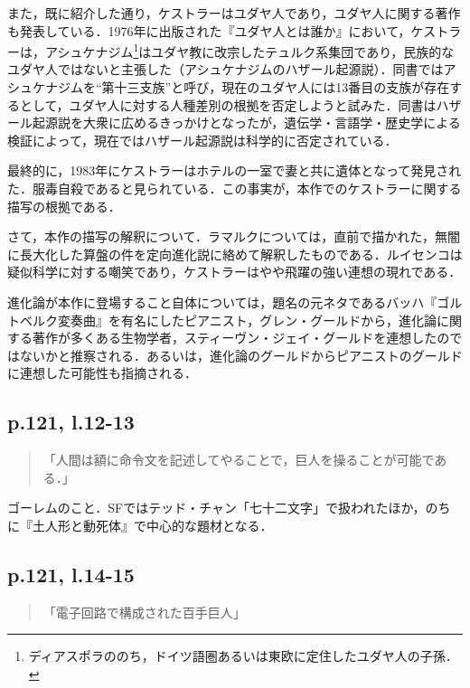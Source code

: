 \documentclass[10pt, a5paper, twoside]{ltjsarticle}
\begin{document}
            また，既に紹介した通り，ケストラーはユダヤ人であり，ユダヤ人に関する著作も発表している．1976年に出版された『ユダヤ人とは誰か』\cite{koestler2}において，ケストラーは，アシュケナジム\footnote{ディアスポラののち，ドイツ語圏あるいは東欧に定住したユダヤ人の子孫．}はユダヤ教に改宗したテュルク系集団であり，民族的なユダヤ人ではないと主張した（アシュケナジムのハザール起源説）．同書ではアシュケナジムを“第十三支族”と呼び，現在のユダヤ人には13番目の支族が存在するとして，ユダヤ人に対する人種差別の根拠を否定しようと試みた．同書はハザール起源説を大衆に広めるきっかけとなったが，遺伝学・言語学・歴史学による検証によって，現在ではハザール起源説は科学的に否定されている．

            最終的に，1983年にケストラーはホテルの一室で妻と共に遺体となって発見された．服毒自殺であると見られている．この事実が，本作でのケストラーに関する描写の根拠である．

            さて，本作の描写の解釈について．ラマルクについては，直前で描かれた，無闇に長大化した算盤の件を定向進化説に絡めて解釈したものである．ルイセンコは疑似科学に対する嘲笑であり，ケストラーはやや飛躍の強い連想の現れである．

            進化論が本作に登場すること自体については，題名の元ネタであるバッハ『ゴルトベルク変奏曲』を有名にしたピアニスト，グレン・グールドから，進化論に関する著作が多くある生物学者，スティーヴン・ジェイ・グールドを連想したのではないかと推察される．あるいは，進化論のグールドからピアニストのグールドに連想した可能性も指摘される．

        \subsection{p.121, l.12-13}

            \begin{quote}
                「人間は額に命令文を記述してやることで，巨人を操ることが可能である．」
            \end{quote}

            ゴーレムのこと．SFではテッド・チャン「七十二文字」で扱われたほか，のちに『土人形と動死体』で中心的な題材となる．

        \subsection{p.121, l.14-15}

            \begin{quote}
                「電子回路で構成された百手巨人」
            \end{quote}
\end{document}
